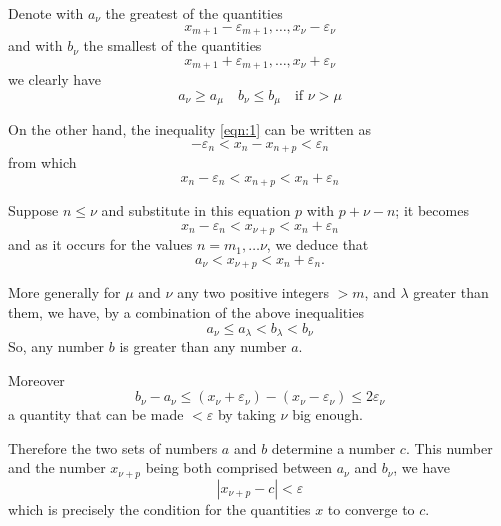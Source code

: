 \documentclass[10pt,letterpaper]{book}
\renewcommand\epsilon{\varepsilon}
\theoremstyle{definition}
\begin{document}
Denote with $a_\nu$ the greatest of the quantities
\[
  x_{m+1}-\epsilon_{m+1},\dots,x_\nu-\epsilon_\nu
\]
and with $b_\nu$ the smallest of the quantities
\[
  x_{m+1}+\epsilon_{m+1},\dots,x_\nu+\epsilon_\nu
\]
we clearly have
\[
  a_\nu\geq a_\mu\quad b_\nu\leq b_\mu\quad\mbox{if }\nu>\mu
\]

On the other hand, the inequality \ref{eqn:1} can be written as
\[
  -\epsilon_n<x_n-x_{n+p}<\epsilon_n
\]
from which
\[
  x_n-\epsilon_n<x_{n+p}<x_n+\epsilon_n
\]

Suppose $n\leq\nu$ and substitute in this equation $p$ with $p+\nu-n$; it becomes
\[
  x_n-\epsilon_n<x_{\nu+p}<x_n+\epsilon_n
\]
and as it occurs for the values $n=m_1,\dots\nu$, we deduce that
\[
  a_\nu<x_{\nu+p}<x_n+\epsilon_n.
\]

More generally for $\mu$ and $\nu$ any two positive integers $>m$, and $\lambda$ greater than them, we have, by a combination of the above inequalities
\[
  a_\nu\leq a_\lambda < b_\lambda < b_\nu
\]
So, any number $b$ is greater than any number $a$.

Moreover
\[
  b_\nu-a_\nu\leq(x_\nu+\epsilon_\nu) - (x_\nu-\epsilon_\nu)\leq 2\epsilon_\nu
\]
a quantity that can be made $<\epsilon$ by taking $\nu$ big enough.

Therefore the two sets of numbers $a$ and $b$ determine a number $c$. This number and the number $x_{\nu+p}$ being both comprised between $a_\nu$ and $b_\nu$, we have
\[
  |x_{\nu+p}-c|<\epsilon
\]
which is precisely the condition for the quantities $x$ to converge to $c$.

\begin{thebibliography}{9}

\end{thebibliography}
\end{document}

